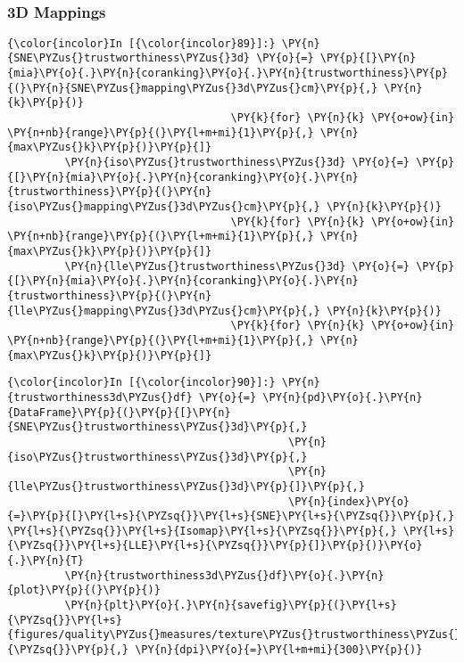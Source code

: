     \begin{center}
    \end{center}
    { \hspace*{\fill} \\}

    \subsubsection{3D Mappings}\label{d-mappings}

    \begin{Verbatim}[commandchars=\\\{\}]
{\color{incolor}In [{\color{incolor}89}]:} \PY{n}{SNE\PYZus{}trustworthiness\PYZus{}3d} \PY{o}{=} \PY{p}{[}\PY{n}{mia}\PY{o}{.}\PY{n}{coranking}\PY{o}{.}\PY{n}{trustworthiness}\PY{p}{(}\PY{n}{SNE\PYZus{}mapping\PYZus{}3d\PYZus{}cm}\PY{p}{,} \PY{n}{k}\PY{p}{)}
                                   \PY{k}{for} \PY{n}{k} \PY{o+ow}{in} \PY{n+nb}{range}\PY{p}{(}\PY{l+m+mi}{1}\PY{p}{,} \PY{n}{max\PYZus{}k}\PY{p}{)}\PY{p}{]}
         \PY{n}{iso\PYZus{}trustworthiness\PYZus{}3d} \PY{o}{=} \PY{p}{[}\PY{n}{mia}\PY{o}{.}\PY{n}{coranking}\PY{o}{.}\PY{n}{trustworthiness}\PY{p}{(}\PY{n}{iso\PYZus{}mapping\PYZus{}3d\PYZus{}cm}\PY{p}{,} \PY{n}{k}\PY{p}{)}
                                   \PY{k}{for} \PY{n}{k} \PY{o+ow}{in} \PY{n+nb}{range}\PY{p}{(}\PY{l+m+mi}{1}\PY{p}{,} \PY{n}{max\PYZus{}k}\PY{p}{)}\PY{p}{]}
         \PY{n}{lle\PYZus{}trustworthiness\PYZus{}3d} \PY{o}{=} \PY{p}{[}\PY{n}{mia}\PY{o}{.}\PY{n}{coranking}\PY{o}{.}\PY{n}{trustworthiness}\PY{p}{(}\PY{n}{lle\PYZus{}mapping\PYZus{}3d\PYZus{}cm}\PY{p}{,} \PY{n}{k}\PY{p}{)}
                                   \PY{k}{for} \PY{n}{k} \PY{o+ow}{in} \PY{n+nb}{range}\PY{p}{(}\PY{l+m+mi}{1}\PY{p}{,} \PY{n}{max\PYZus{}k}\PY{p}{)}\PY{p}{]}
\end{Verbatim}

    \begin{Verbatim}[commandchars=\\\{\}]
{\color{incolor}In [{\color{incolor}90}]:} \PY{n}{trustworthiness3d\PYZus{}df} \PY{o}{=} \PY{n}{pd}\PY{o}{.}\PY{n}{DataFrame}\PY{p}{(}\PY{p}{[}\PY{n}{SNE\PYZus{}trustworthiness\PYZus{}3d}\PY{p}{,}
                                            \PY{n}{iso\PYZus{}trustworthiness\PYZus{}3d}\PY{p}{,}
                                            \PY{n}{lle\PYZus{}trustworthiness\PYZus{}3d}\PY{p}{]}\PY{p}{,}
                                            \PY{n}{index}\PY{o}{=}\PY{p}{[}\PY{l+s}{\PYZsq{}}\PY{l+s}{SNE}\PY{l+s}{\PYZsq{}}\PY{p}{,} \PY{l+s}{\PYZsq{}}\PY{l+s}{Isomap}\PY{l+s}{\PYZsq{}}\PY{p}{,} \PY{l+s}{\PYZsq{}}\PY{l+s}{LLE}\PY{l+s}{\PYZsq{}}\PY{p}{]}\PY{p}{)}\PY{o}{.}\PY{n}{T}
         \PY{n}{trustworthiness3d\PYZus{}df}\PY{o}{.}\PY{n}{plot}\PY{p}{(}\PY{p}{)}
         \PY{n}{plt}\PY{o}{.}\PY{n}{savefig}\PY{p}{(}\PY{l+s}{\PYZsq{}}\PY{l+s}{figures/quality\PYZus{}measures/texture\PYZus{}trustworthiness\PYZus{}3d.png}\PY{l+s}{\PYZsq{}}\PY{p}{,} \PY{n}{dpi}\PY{o}{=}\PY{l+m+mi}{300}\PY{p}{)}
\end{Verbatim}

